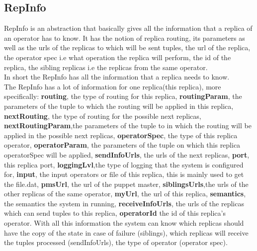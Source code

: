 \documentclass[times, 10pt, twocolumn]{article}
\begin{document}
\subsection{RepInfo}
RepInfo is an abstraction that basically gives all the information that a replica of an operator has to know. It has the notion of replica routing, its parameters as well as the urls of the replicas to which will be sent tuples, the url of the replica, the operator spec i.e what operation the replica will perform, the id of the replica, the sibling replicas i.e the replicas from the same operator. 
\\In short the RepInfo has all the information that a replica needs to know.
\\The RepInfo has a lot of information for one replica(this replica), more specifically: \textbf{routing}, the type of routing for this replica, \textbf{routingParam}, the parameters of the tuple to which the routing will be applied in this replica, \textbf{nextRouting}, the type of routing for the possible next replicas, \textbf{nextRoutingParam},the parameters of the tuple to in which the routing will be applied in the possible next replicas, \textbf{operatorSpec}, the type of this replica operator, \textbf{operatorParam}, the parameters of the tuple on which this replica operatorSpec will be applied, \textbf{sendInfoUrls}, the urls of the next replicas, \textbf{port}, this replica port, \textbf{loggingLvl},the type of logging that the system is configured for, \textbf{input}, the input operators or file of this replica, this is mainly used to get the file.dat, \textbf{pmsUrl}, the url of the puppet master, \textbf{siblingsUrls},the urls of the other replicas of the same operator, \textbf{myUrl}, the url of this replica, \textbf{semantics}, the semantics the system in running, \textbf{receiveInfoUrls}, the urls of the replicas which can send tuples to this replica, \textbf{operatorId} the id of this replica's operator. With all this information the system can know which replicas should have the copy of the state in case of failure (siblings), which replicas will receive the tuples processed (sendInfoUrls), the type of operator (operator spec).


\end{document}
